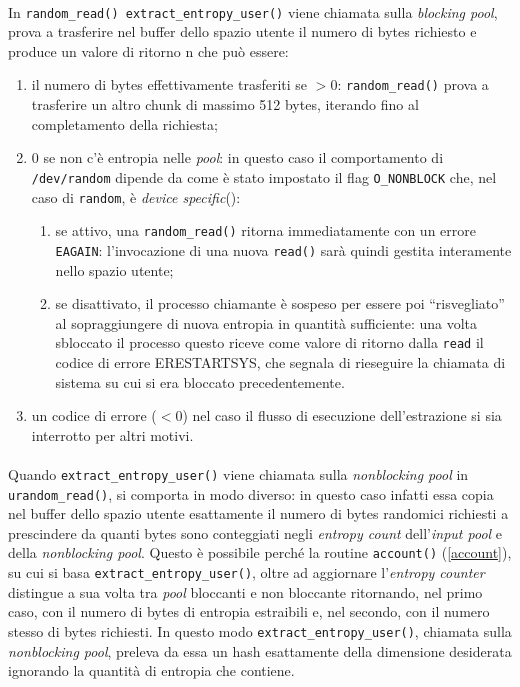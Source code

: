 \documentclass{article}
\begin{document}
  \paragraph{} In \verb+random_read() extract_entropy_user()+ viene chiamata sulla
 \emph{blocking pool}, prova a trasferire nel buffer dello spazio utente il
 numero di bytes richiesto e produce un valore di ritorno n che può essere:
 \begin{enumerate}
   \item il numero di bytes effettivamente trasferiti se $> 0$:
   \verb+random_read()+ prova a trasferire un altro chunk di massimo 512
   bytes, iterando fino al completamento della richiesta;
   \item 0 se non c'è entropia nelle \emph{pool}: in questo caso il
   comportamento di \verb+/dev/random+ dipende da come è stato impostato
   il flag \verb+O_NONBLOCK+ che, nel caso di \verb+random+, è
   \emph{device specific}(\cite{kerr}):
   \begin{enumerate}
     \item se attivo, una \verb+random_read()+ ritorna immediatamente con un
     errore \verb+EAGAIN+: l'invocazione di una nuova \verb+read()+ sarà quindi
     gestita interamente nello spazio utente;
     \item se disattivato, il processo chiamante è sospeso per essere
     poi ``risvegliato'' al sopraggiungere di nuova entropia in quantità
     sufficiente: una volta sbloccato il processo questo riceve come valore di
     ritorno dalla \verb+read+ il codice di errore ERESTARTSYS, che segnala di
     rieseguire la chiamata di sistema su cui si era bloccato precedentemente.
   \end{enumerate}
   \item un codice di errore ($< 0$) nel caso il flusso di esecuzione
   dell'estrazione si sia interrotto per altri motivi.
 \end{enumerate}
 
 \paragraph{} Quando \verb+extract_entropy_user()+ viene chiamata sulla
 \emph{nonblocking pool} in \verb+urandom_read()+, si comporta in modo diverso:
 in questo caso infatti essa copia nel buffer dello spazio utente esattamente
 il numero di bytes randomici richiesti a prescindere da quanti bytes sono
 conteggiati negli \emph{entropy count} dell'\emph{input pool} e della 
 \emph{nonblocking pool}. Questo è possibile perché la routine
 \verb+account()+ (\ref{account}), su cui si basa \verb+extract_entropy_user()+,
 oltre ad aggiornare l'\emph{entropy counter} distingue a sua volta tra
 \emph{pool} bloccanti e non bloccante ritornando, nel primo caso, con il numero
 di bytes di entropia estraibili e, nel secondo, con il numero stesso di
 bytes richiesti. In questo modo \verb+extract_entropy_user()+, chiamata sulla
 \emph{nonblocking pool}, preleva da essa un hash esattamente della dimensione
 desiderata ignorando la quantità di entropia che contiene.
 
\end{document}
